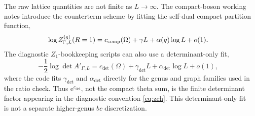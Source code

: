 \documentclass[11pt]{article}
\numberwithin{equation}{section}
\newcommand{\ee}{\mathrm e}
\begin{document}
The raw lattice quantities are not finite as \(L\to\infty\).  The compact-boson
working notes introduce the counterterm scheme by fitting the self-dual compact
partition function,
\begin{equation}
        \log Z^{(g)}_{\Gamma,L}(R=1)
        =
        c_{\rm comp}(\Omega)+\gamma L+\alpha(g)\log L+o(1).
        \label{eq:compactfit}
\end{equation}
The diagnostic \(Z_1\)-bookkeeping scripts can also use a determinant-only fit,
\begin{equation}
        -\frac{1}{2}\log\det A'_{\Gamma,L}
        =
        c_{\det}(\Omega)+\gamma_{\det} L+\alpha_{\det}\log L+o(1),
        \label{eq:detfit}
\end{equation}
where the code fits \(\gamma_{\det}\) and \(\alpha_{\det}\) directly for the
genus and graph families used in the ratio check.  Thus \(\ee^{c_{\det}}\), not
the compact theta sum, is the finite determinant factor appearing in the
diagnostic convention \eqref{eq:zch}.  This determinant-only fit is not a
separate higher-genus \(bc\) discretization.
\end{document}
